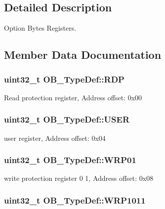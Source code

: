 \subsection{Detailed Description}
Option Bytes Registers. 

\subsection{Member Data Documentation}
\hypertarget{struct_o_b___type_def_a431dc8b09670085199c380017243c0ea}{
\subsubsection[{R\-D\-P}]{ uint32\-\_\-t O\-B\-\_\-\-Type\-Def\-::\-R\-D\-P}}\label{struct_o_b___type_def_a431dc8b09670085199c380017243c0ea}
Read protection register, Address offset\-: 0x00 \hypertarget{struct_o_b___type_def_a21dbc215f1bc3a7b2d26538a7a5fdfdd}{
\subsubsection[{U\-S\-E\-R}]{ uint32\-\_\-t O\-B\-\_\-\-Type\-Def\-::\-U\-S\-E\-R}}\label{struct_o_b___type_def_a21dbc215f1bc3a7b2d26538a7a5fdfdd}
user register, Address offset\-: 0x04 \hypertarget{struct_o_b___type_def_a6db927d69c0fa4753d732278702f5ba1}{
\subsubsection[{W\-R\-P01}]{ uint32\-\_\-t O\-B\-\_\-\-Type\-Def\-::\-W\-R\-P01}}\label{struct_o_b___type_def_a6db927d69c0fa4753d732278702f5ba1}
write protection register 0 1, Address offset\-: 0x08 \hypertarget{struct_o_b___type_def_a654f411ab93f1115801fae502576f983}{
\subsubsection[{W\-R\-P1011}]{ uint32\-\_\-t O\-B\-\_\-\-Type\-Def\-::\-W\-R\-P1011}}\label{struct_o_b___type_def_a654f411ab93f1115801fae502576f983}
